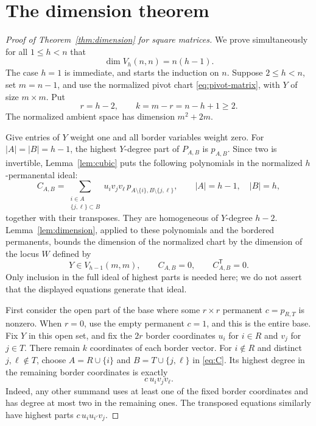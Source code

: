 \documentclass[11pt]{article}
\theoremstyle{remark}
\newcommand{\smallset}[2]{#1\setminus\{#2\}}
\numberwithin{equation}{section}
\begin{document}
\section{The dimension theorem}\label{sec:dimension}

\begin{proof}[Proof of Theorem~\ref{thm:dimension} for square matrices]
We prove simultaneously for all $1\leq h<n$ that
\begin{equation}\label{eq:square}
 \dim V_h(n,n)=n(h-1).
\end{equation}
The case $h=1$ is immediate, and starts the induction on $n$.
Suppose $2\leq h<n$, set $m=n-1$, and use the normalized pivot chart
\eqref{eq:pivot-matrix}, with $Y$ of size $m\times m$.
Put
\[
 r=h-2,\qquad k=m-r=n-h+1\geq2.
\]
The normalized ambient space has dimension $m^2+2m$.

Give entries of $Y$ weight one and all border variables weight zero.
For $|A|=|B|=h-1$, the highest $Y$-degree part of $P_{A,B}$ is
$p_{A,B}$. Since two is invertible, Lemma~\ref{lem:cubic} puts the
following polynomials in the normalized $h$-permanental ideal:
\begin{equation}\label{eq:C}
 C_{A,B}=
 \sum_{\substack{i\in A\\\{j,\ell\}\subset B}}
 u_i v_jv_\ell\,p_{\smallset A i,B\setminus\{j,\ell\}},
 \qquad |A|=h-1,\quad |B|=h,
\end{equation}
together with their transposes. They are homogeneous of $Y$-degree
$h-2$. Lemma~\ref{lem:dimension}, applied to these polynomials and
the bordered permanents, bounds the dimension of the normalized
chart by the dimension of the locus $W$ defined by
\begin{equation}\label{eq:W}
 Y\in V_{h-1}(m,m),\qquad C_{A,B}=0,
 \qquad C^{\mathsf T}_{A,B}=0.
\end{equation}
Only inclusion in the full ideal of highest parts is needed here;
we do not assert that the displayed equations generate that ideal.

First consider the open part of the base where some $r\times r$
permanent $c=p_{R,T}$ is nonzero. When $r=0$, use the empty permanent
$c=1$, and this is the entire base. Fix $Y$ in this open set, and
fix the $2r$ border coordinates $u_i$ for $i\in R$ and $v_j$ for
$j\in T$. There remain $k$ coordinates of each border vector.
For $i\notin R$ and distinct $j,\ell\notin T$, choose
$A=R\cup\{i\}$ and $B=T\cup\{j,\ell\}$ in \eqref{eq:C}.
Its highest degree in the remaining border coordinates is exactly
\begin{equation}\label{eq:second-top}
 c\,u_i v_jv_\ell.
\end{equation}
Indeed, any other summand uses at least one of the fixed border
coordinates and has degree at most two in the remaining ones.
The transposed equations similarly have highest parts
$c\,u_i u_{i'}v_j$.


\end{proof}
\end{document}
